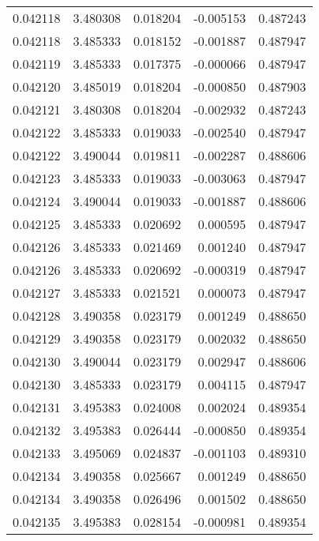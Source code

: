 \begin{tabular}{lrrrr}
0.042118    &  3.480308 &  0.018204 & -0.005153 &             0.487243 \\
0.042118    &  3.485333 &  0.018152 & -0.001887 &             0.487947 \\
0.042119    &  3.485333 &  0.017375 & -0.000066 &             0.487947 \\
0.042120    &  3.485019 &  0.018204 & -0.000850 &             0.487903 \\
0.042121    &  3.480308 &  0.018204 & -0.002932 &             0.487243 \\
0.042122    &  3.485333 &  0.019033 & -0.002540 &             0.487947 \\
0.042122    &  3.490044 &  0.019811 & -0.002287 &             0.488606 \\
0.042123    &  3.485333 &  0.019033 & -0.003063 &             0.487947 \\
0.042124    &  3.490044 &  0.019033 & -0.001887 &             0.488606 \\
0.042125    &  3.485333 &  0.020692 &  0.000595 &             0.487947 \\
0.042126    &  3.485333 &  0.021469 &  0.001240 &             0.487947 \\
0.042126    &  3.485333 &  0.020692 & -0.000319 &             0.487947 \\
0.042127    &  3.485333 &  0.021521 &  0.000073 &             0.487947 \\
0.042128    &  3.490358 &  0.023179 &  0.001249 &             0.488650 \\
0.042129    &  3.490358 &  0.023179 &  0.002032 &             0.488650 \\
0.042130    &  3.490044 &  0.023179 &  0.002947 &             0.488606 \\
0.042130    &  3.485333 &  0.023179 &  0.004115 &             0.487947 \\
0.042131    &  3.495383 &  0.024008 &  0.002024 &             0.489354 \\
0.042132    &  3.495383 &  0.026444 & -0.000850 &             0.489354 \\
0.042133    &  3.495069 &  0.024837 & -0.001103 &             0.489310 \\
0.042134    &  3.490358 &  0.025667 &  0.001249 &             0.488650 \\
0.042134    &  3.490358 &  0.026496 &  0.001502 &             0.488650 \\
0.042135    &  3.495383 &  0.028154 & -0.000981 &             0.489354 \\

\end{tabular}
